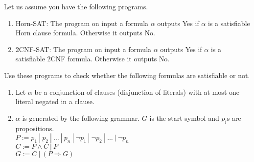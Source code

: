 \begin{exercise}
Let us assume you have the following programs.
\begin{enumerate}
\item Horn-SAT: The program on input a formula $\alpha$ outputs Yes if $\alpha$ is a satisfiable Horn clause formula. Otherwise it outputs No.
\item 2CNF-SAT: The program on input a formula $\alpha$ outputs Yes if $\alpha$ is a satisfiable 2CNF formula. Otherwise it outputs No.
\end{enumerate}
Use these programs to check whether the following formulas are satisfiable or not.
\begin{enumerate}[label=(\alph*)]
\item Let $\alpha$ be a conjunction of clauses (disjunction of literals) with at most one literal negated in a clause.
\item $\alpha$ is generated by the following grammar. $G$ is the start symbol and $p_i$s are propositions. \\
$P := p_1 ~|~ p_2 ~|~ \dots ~|~ p_n ~|~ \neg p_1 ~|~ \neg p_2 ~|~ \dots ~|~ \neg p_n$ \\
$C := P \wedge C ~|~ P$ \\
$G := C ~|~ (P \Rightarrow G)$
\end{enumerate}
\end{exercise}